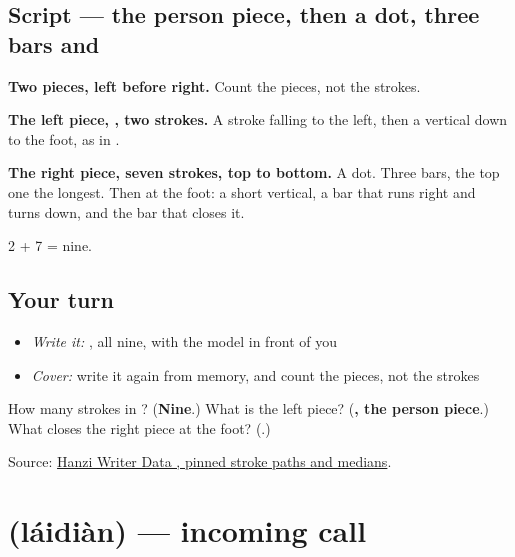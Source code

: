 \subsection*{Script — the person piece, then a dot, three bars and }

\begin{quote}
\end{quote}

\textbf{Two pieces, left before right.} Count the pieces, not the strokes.

\textbf{The left piece, , two strokes.} A stroke falling to the left, then a vertical down to the foot, as in .

\textbf{The right piece, seven strokes, top to bottom.} A dot. Three bars, the top one the longest. Then  at the foot: a short vertical, a bar that runs right and turns down, and the bar that closes it.

2 + 7 = nine.

\subsection*{Your turn}
\begin{itemize}
\raggedright
  \item \emph{Write it:} , all nine, with the model in front of you
  \item \emph{Cover:} write it again from memory, and count the pieces, not the strokes
\end{itemize}

\begin{tcolorbox}[breakable,colback=teal!4,colframe=teal!35!black,title={Before you move on}]
How many strokes in ? (\textbf{Nine}.) What is the left piece? (\textbf{, the person piece}.) What closes the right piece at the foot? (\textbf{}.)

Source: \href{https://raw.githubusercontent.com/chanind/hanzi-writer-data/68d10a4b21150cae5e1ebbd223eed289cf32d90c/data/\%E4\%BF\%A1.json}{Hanzi Writer Data , pinned stroke paths and medians}.
\end{tcolorbox}
\section[\texorpdfstring{\zh{来电} (láidiàn)}{来电 (láidiàn)}]{ (láidiàn) — incoming call}

